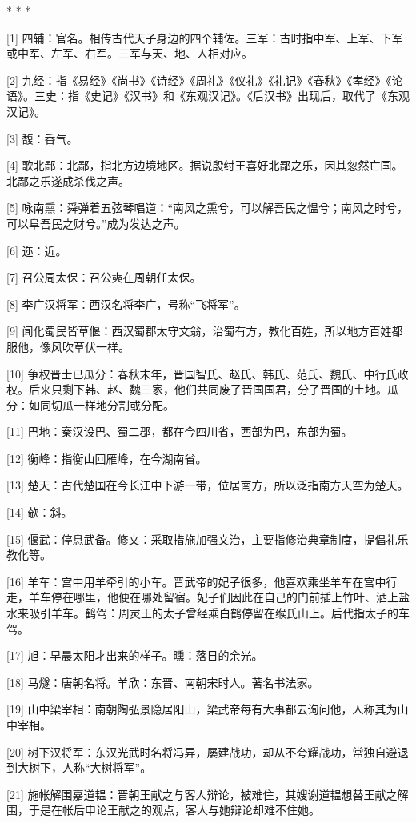 \documentclass[12pt,UTF8]{ctexbook}
\begin{document}
* * *



[1] 四辅：官名。相传古代天子身边的四个辅佐。三军：古时指中军、上军、下军或中军、左军、右军。三军与天、地、人相对应。

[2] 九经：指《易经》《尚书》《诗经》《周礼》《仪礼》《礼记》《春秋》《孝经》《论语》。三史：指《史记》《汉书》和《东观汉记》。《后汉书》出现后，取代了《东观汉记》。

[3] 馥：香气。

[4] 歌北鄙：北鄙，指北方边境地区。据说殷纣王喜好北鄙之乐，因其忽然亡国。北鄙之乐遂成杀伐之声。

[5] 咏南熏：舜弹着五弦琴唱道：“南风之熏兮，可以解吾民之愠兮；南风之时兮，可以阜吾民之财兮。”成为发达之声。

[6] 迩：近。

[7] 召公周太保：召公奭在周朝任太保。

[8] 李广汉将军：西汉名将李广，号称“飞将军”。

[9] 闻化蜀民皆草偃：西汉蜀郡太守文翁，治蜀有方，教化百姓，所以地方百姓都服他，像风吹草伏一样。

[10] 争权晋士已瓜分：春秋末年，晋国智氏、赵氏、韩氏、范氏、魏氏、中行氏政权。后来只剩下韩、赵、魏三家，他们共同废了晋国国君，分了晋国的土地。瓜分：如同切瓜一样地分割或分配。

[11] 巴地：秦汉设巴、蜀二郡，都在今四川省，西部为巴，东部为蜀。

[12] 衡峰：指衡山回雁峰，在今湖南省。

[13] 楚天：古代楚国在今长江中下游一带，位居南方，所以泛指南方天空为楚天。

[14] 欹：斜。

[15] 偃武：停息武备。修文：采取措施加强文治，主要指修治典章制度，提倡礼乐教化等。

[16] 羊车：宫中用羊牵引的小车。晋武帝的妃子很多，他喜欢乘坐羊车在宫中行走，羊车停在哪里，他便在哪处留宿。妃子们因此在自己的门前插上竹叶、洒上盐水来吸引羊车。鹤驾：周灵王的太子曾经乘白鹤停留在缑氏山上。后代指太子的车驾。

[17] 旭：早晨太阳才出来的样子。曛：落日的余光。

[18] 马燧：唐朝名将。羊欣：东晋、南朝宋时人。著名书法家。

[19] 山中梁宰相：南朝陶弘景隐居阳山，梁武帝每有大事都去询问他，人称其为山中宰相。

[20] 树下汉将军：东汉光武时名将冯异，屡建战功，却从不夸耀战功，常独自避退到大树下，人称“大树将军”。

[21] 施帐解围嘉道韫：晋朝王献之与客人辩论，被难住，其嫂谢道韫想替王献之解围，于是在帐后申论王献之的观点，客人与她辩论却难不住她。
\end{document}
